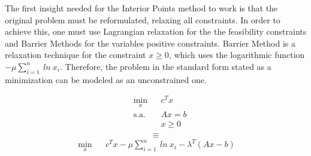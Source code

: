 \documentclass[a4paper]{IEEEtran}
\begin{document}
The first insight needed for the Interior Points method to work is that the original problem must be reformulated, relaxing all constraints. In order to achieve this, one must use Lagrangian relaxation for the the feasibility constraints and Barrier Methods for the variables positive constraints. Barrier Method is a relaxation technique for the constraint $x \geq 0$, which uses the logarithmic function $-\mu \sum_{i=1}^n ~ln~ x_i$.  Therefore, the problem in the standard form stated as a minimization can be modeled as an unconstrained one.

\begin{equation}
\begin{aligned}
\ &\underset{x}{\text{min}}
& & c^T x\\
& \text{s.a.}
& & Ax = b \\
&&& x \geq 0 \\
\end{aligned}
\end{equation}
\begin{equation*}
\equiv
\end{equation*}
\begin{equation}
\begin{aligned}
\ \underset{x}{\text{min}}
& & c^T x -\mu \sum_{i=1}^n ~ln~ x_i - \lambda^{T}(Ax-b)\\
\end{aligned}
\end{equation}
\end{document}
